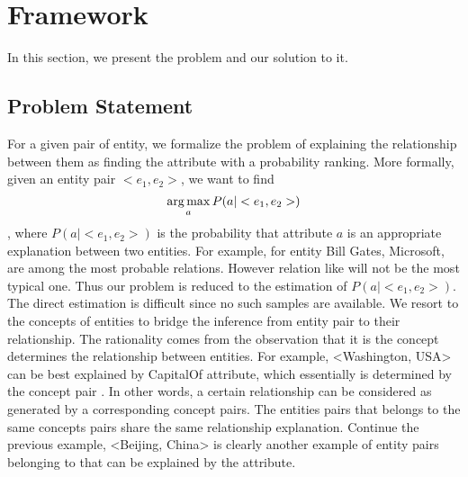 
\section{Framework}
\label{sec:framework}

In this section, we present the problem and our solution to it.

\subsection{Problem Statement}

For a given pair of entity, we formalize the problem of explaining the relationship between them as finding the attribute with a probability ranking. 
More formally, given an entity pair $<e_1, e_2>$, we want to find
$$\operatorname*{arg\,max}_a P(a|<e_1,e_2>)$$,  
where $P(a|<e_1, e_2>)$ is the probability that attribute $a$ is an appropriate explanation between two entities.
For example, for entity \ac{Bill Gates, Microsoft},  are among the most probable relations. 
However relation like  will not be the most typical one.
Thus our problem is reduced to the estimation of $P(a|<e_1, e_2>)$. 
The direct estimation is difficult since no such samples are available. 
We resort to the concepts of entities to bridge the inference from entity pair to their relationship.  
The rationality comes from the observation that it is the concept determines the relationship between entities. 
For example, \ac{<Washington, USA>} can be best explained by \ac{CapitalOf} attribute, which essentially is determined by the concept pair . 
In other words, a certain relationship can be considered as generated by a corresponding concept pairs.  
The entities pairs that belongs to the same concepts pairs share the same relationship explanation. 
Continue the previous example, \ac{<Beijing, China>} is clearly another example of entity pairs belonging to  that can be explained by the  attribute.

